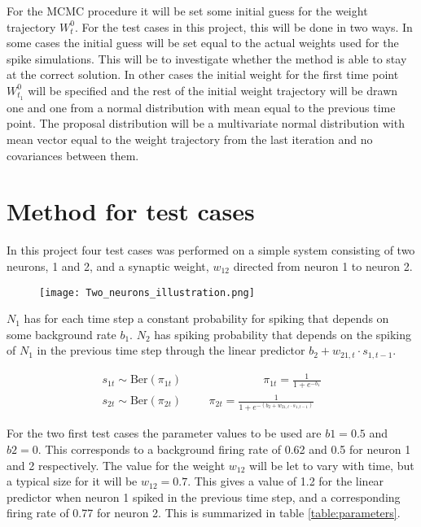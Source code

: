 For the MCMC procedure it will be set some initial guess for the weight trajectory $W_t^0$. For the test cases in this project, this will be done in two ways. In some cases the initial guess will be set equal to the actual weights used for the spike simulations. This will be to investigate whether the method is able to stay at the correct solution. In other cases the initial weight for the first time point $W_{t_1}^0$ will be specified and the rest of the initial weight trajectory will be drawn one and one from a normal distribution with mean equal to the previous time point. The proposal distribution will be a  multivariate normal distribution with mean vector equal to the weight trajectory from the last iteration and no covariances between them. 


\section{Method for test cases}
\label{Method}

In this project four test cases was performed on a simple system consisting of two neurons, 1 and 2, and a synaptic weight, $w_{12}$ directed from neuron 1 to neuron 2.

\begin{figure}[h]
    \centering
    \texttt{[image: Two\_neurons\_illustration.png]}
\end{figure}

$N_1$ has for each time step a constant probability for spiking that depends on some background rate $b_1$. $N_2$ has spiking probability that depends on the spiking of $N_1$ in the previous time step through the linear predictor $b_2 + w_{21,t} \cdot s_{1,t-1}$. 

\begin{equation}
\begin{split}
\label{Eq:TestCase}
    s_{1t} \sim \text{Ber}(\pi_{1t}) \hspace{3cm} \pi_{1t}= \frac{1}{1+e^{-b_1}} \\
    s_{2t} \sim \text{Ber}(\pi_{2t}) \hspace{1cm} \pi_{2t}= \frac{1}{1+e^{-(b_2 + w_{21,t} \cdot s_{1,t-1})}}
\end{split}
\end{equation}

For the two first test cases the parameter values to be used are $b1 = 0.5$ and $b2 = 0$. This corresponds to a background firing rate of 0.62 and 0.5 for neuron 1 and 2 respectively. The value for the weight $w_{12}$ will be let to vary with time, but a typical size for it will be $w_{12}=0.7$. This gives a value of 1.2 for the linear predictor when neuron 1 spiked in the previous time step, and a corresponding firing rate of 0.77 for neuron 2. This is summarized in table \ref{table:parameters}.


